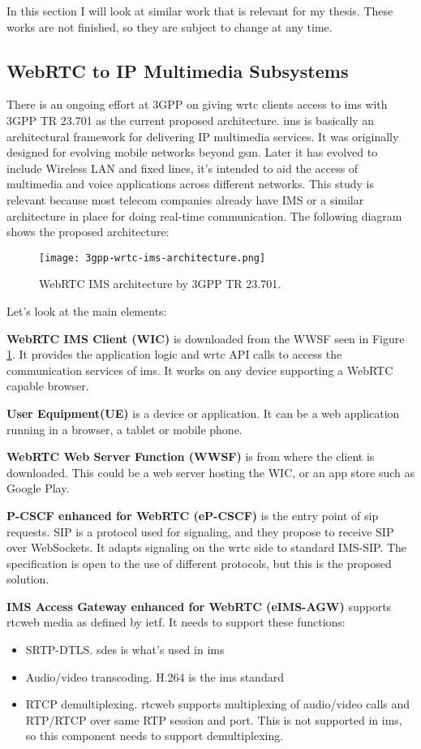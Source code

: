 In this section I will look at similar work that is relevant for my thesis. These works are not finished, so they are subject to change at any time.

\subsection{WebRTC to IP Multimedia Subsystems}
There is an ongoing effort at 3GPP on giving \gls{wrtc} clients access to \gls{ims} with 3GPP TR 23.701\cite{3gpp-wrtc-access-ims} as the current proposed architecture. \gls{ims} is basically an architectural framework for delivering IP multimedia services. It was originally designed for evolving mobile networks beyond \gls{gsm}. Later it has evolved to include Wireless LAN and fixed lines, it's intended to aid the access of multimedia and voice applications across different networks. This study is relevant because most telecom companies already have IMS or a similar architecture in place for doing real-time communication. The following diagram shows the proposed architecture:

\begin{figure}[here]
\centerline{\texttt{[image: 3gpp-wrtc-ims-architecture.png]}}
\caption{WebRTC IMS architecture by 3GPP TR 23.701.}
\label{fig:wrtc-ims-architecture}
\end{figure}

Let's look at the main elements:

\textbf{WebRTC IMS Client (WIC)}
is downloaded from the WWSF seen in Figure \ref{fig:wrtc-ims-architecture}. It provides the application logic and \gls{wrtc} API calls to access the communication services of \gls{ims}. It works on any device supporting a WebRTC capable browser.

\textbf{User Equipment(UE)}
is a device or application. It can be a web application running in a browser, a tablet or mobile phone.

\textbf{WebRTC Web Server Function (WWSF)}
is from where the client is downloaded. This could be a web server hosting the WIC, or an app store such as Google Play.

\textbf{P-CSCF enhanced for WebRTC (eP-CSCF)}
is the entry point of \gls{sip} requests. SIP is a protocol used for signaling, and they propose to receive SIP over WebSockets. It adapts signaling on the \gls{wrtc} side to standard IMS-SIP. The specification is open to the use of different protocols, but this is the proposed solution.

\textbf{IMS Access Gateway enhanced for WebRTC (eIMS-AGW)}
supports \gls{rtcweb} media as defined by \gls{ietf}. It needs to support these functions:
\begin{itemize}
\item{SRTP-DTLS. \gls{sdes} is what's used in \gls{ims}}
\item{Audio/video transcoding. H.264 is the \gls{ims} standard}
\item{RTCP demultiplexing. \gls{rtcweb} supports multiplexing of audio/video calls and RTP/RTCP over same RTP session and port. This is not supported in \gls{ims}, so this component needs to support demultiplexing.}
\end{itemize}

